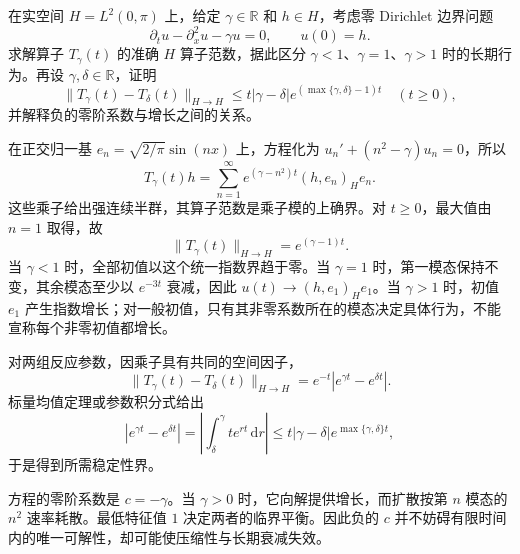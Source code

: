 \begin{exercise}\label{b2:ex:app-D-10}
在实空间 \(H=L^2(0,\pi)\) 上，给定 \(\gamma\in\mathbb R\) 和 \(h\in H\)，考虑零 Dirichlet 边界问题
\[
 \partial_tu-\partial_x^2u-\gamma u=0,
 \qquad u(0)=h.
\]
求解算子 \(T_\gamma(t)\) 的准确 \(H\) 算子范数，据此区分 \(\gamma<1\)、\(\gamma=1\)、\(\gamma>1\) 时的长期行为。再设 \(\gamma,\delta\in\mathbb R\)，证明
\[
 \|T_\gamma(t)-T_\delta(t)\|_{H\to H}
 \leq t|\gamma-\delta|e^{(\max\{\gamma,\delta\}-1)t}
 \quad(t\geq0),
\]
并解释负的零阶系数与增长之间的关系。
\end{exercise}
\begin{solution}
在正交归一基 \(e_n=\sqrt{2/\pi}\sin(nx)\) 上，方程化为
\(u_n'+(n^2-\gamma)u_n=0\)，所以
\[
 T_\gamma(t)h=\sum_{n=1}^\infty e^{(\gamma-n^2)t}(h,e_n)_H e_n.
\]
这些乘子给出强连续半群，其算子范数是乘子模的上确界。对 \(t\geq0\)，最大值由 \(n=1\) 取得，故
\[
 \|T_\gamma(t)\|_{H\to H}=e^{(\gamma-1)t}.
\]
当 \(\gamma<1\) 时，全部初值以这个统一指数界趋于零。当 \(\gamma=1\) 时，第一模态保持不变，其余模态至少以 \(e^{-3t}\) 衰减，因此 \(u(t)\to(h,e_1)_He_1\)。当 \(\gamma>1\) 时，初值 \(e_1\) 产生指数增长；对一般初值，只有其非零系数所在的模态决定具体行为，不能宣称每个非零初值都增长。

对两组反应参数，因乘子具有共同的空间因子，
\[
 \|T_\gamma(t)-T_\delta(t)\|_{H\to H}
 =e^{-t}|e^{\gamma t}-e^{\delta t}|.
\]
标量均值定理或参数积分式给出
\[
 |e^{\gamma t}-e^{\delta t}|
 =\left|\int_\delta^\gamma t e^{rt}\,\mathrm dr\right|
 \leq t|\gamma-\delta|e^{\max\{\gamma,\delta\}t},
\]
于是得到所需稳定性界。

方程的零阶系数是 \(c=-\gamma\)。当 \(\gamma>0\) 时，它向解提供增长，而扩散按第 \(n\) 模态的 \(n^2\) 速率耗散。最低特征值 \(1\) 决定两者的临界平衡。因此负的 \(c\) 并不妨碍有限时间内的唯一可解性，却可能使压缩性与长期衰减失效。
\end{solution}
